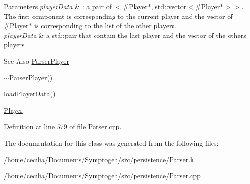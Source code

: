 \begin{DoxyParams}{Parameters}
{\em player\-Data} & \-: a pair of $<$\#\-Player$\ast$, std\-::vector$<$\#\-Player$\ast$$>$$>$. The first component is corresponding to the current player and the vector of \#\-Player$\ast$ is corresponding to the list of the other players.\\
\hline
{\em player\-Data} & a std\-::pair that contain the last player and the vector of the others players \\
\hline
\end{DoxyParams}
\begin{DoxySeeAlso}{See Also}
\hyperlink{class_symp_1_1_parser_player}{Parser\-Player} 

\hyperlink{class_symp_1_1_parser_player_a418e3d0bbe4bb706b6d66aeb903fb9c1}{$\sim$\-Parser\-Player()} 

\hyperlink{class_symp_1_1_parser_player_a5557f2a1924c72138e9a865e46e64d9a}{load\-Player\-Data()} 

\hyperlink{class_symp_1_1_player}{Player} 
\end{DoxySeeAlso}


Definition at line 579 of file Parser.\-cpp.



The documentation for this class was generated from the following files\-:\begin{DoxyCompactItemize}
\item 
/home/cecilia/\-Documents/\-Symptogen/src/persistence/\hyperlink{_parser_8h}{Parser.\-h}\item 
/home/cecilia/\-Documents/\-Symptogen/src/persistence/\hyperlink{_parser_8cpp}{Parser.\-cpp}\end{DoxyCompactItemize}
